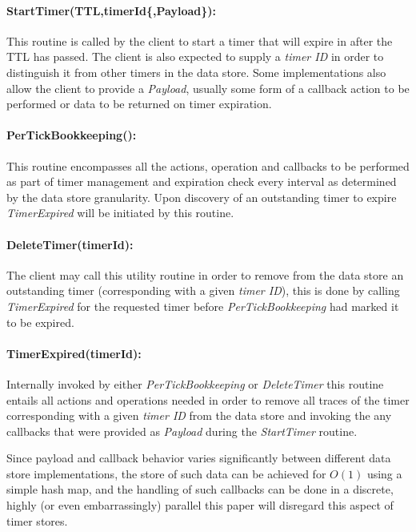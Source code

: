\documentclass[twocolumn,a4paper]{article}
\begin{document}
\paragraph{StartTimer(TTL,timerId\{,Payload\}):} This routine is called by the client to start a timer that will expire in after the TTL has passed. The client is also expected to supply a \textit{timer ID} in order to distinguish it from other timers in the data store. Some implementations also allow the client to provide a \textit{Payload}, usually some form of a callback action to be performed or data to be returned on timer expiration.

\paragraph{PerTickBookkeeping():} This routine encompasses all the actions, operation and callbacks to be performed as part of timer management and  expiration check every interval as determined by the data store granularity. Upon discovery of an outstanding timer to expire \textit{TimerExpired} will be initiated by this routine.

\paragraph{DeleteTimer(timerId):} The client may call this utility routine in order to remove from the data store an outstanding timer (corresponding with a given \textit{timer ID}), this is done by calling \textit{TimerExpired} for the requested timer before \textit{PerTickBookkeeping} had marked it to be expired.

\paragraph{TimerExpired(timerId):} Internally invoked by either \textit{PerTickBookkeeping} or \textit{DeleteTimer} this routine entails all actions and operations needed in order to remove all traces of the timer corresponding with a given \textit{timer ID} from the data store and invoking the any callbacks that were provided as \textit{Payload} during the \textit{StartTimer} routine.

\vspace{5mm}

Since payload and callback behavior varies significantly between different data store implementations, the store of such data can be achieved for $ O(1) $ using a simple hash map, and the handling of such callbacks can be done in a discrete, highly (or even embarrassingly) parallel this paper will disregard this aspect of timer stores.
\end{document}
